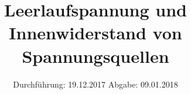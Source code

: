 

\subject{V301}
\title{Leerlaufspannung und Innenwiderstand von Spannungsquellen}
\date{%
  Durchführung: 19.12.2017
  \hspace{3em}
  Abgabe: 09.01.2018
}



\maketitle
\thispagestyle{empty}
\tableofcontents
\newpage






\printbibliography{}


